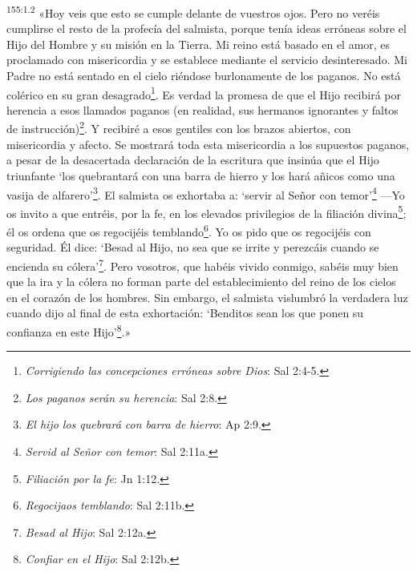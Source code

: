 \par 
\textsuperscript{155:1.2} «Hoy veis que esto se cumple delante de vuestros ojos. Pero no veréis cumplirse el resto de la profecía del salmista, porque tenía ideas erróneas sobre el Hijo del Hombre y su misión en la Tierra. Mi reino está basado en el amor, es proclamado con misericordia y se establece mediante el servicio desinteresado. Mi Padre no está sentado en el cielo riéndose burlonamente de los paganos. No está colérico en su gran desagrado\footnote{\textit{Corrigiendo las concepciones erróneas sobre Dios}: Sal 2:4-5.}. Es verdad la promesa de que el Hijo recibirá por herencia a esos llamados paganos (en realidad, sus hermanos ignorantes y faltos de instrucción)\footnote{\textit{Los paganos serán su herencia}: Sal 2:8.}. Y recibiré a esos gentiles con los brazos abiertos, con misericordia y afecto. Se mostrará toda esta misericordia a los supuestos paganos, a pesar de la desacertada declaración de la escritura que insinúa que el Hijo triunfante `los quebrantará con una barra de hierro y los hará añicos como una vasija de alfarero'\footnote{\textit{El hijo los quebrará con barra de hierro}: Ap 2:9.}. El salmista os exhortaba a: `servir al Señor con temor'\footnote{\textit{Servid al Señor con temor}: Sal 2:11a.} ---Yo os invito a que entréis, por la fe, en los elevados privilegios de la filiación divina\footnote{\textit{Filiación por la fe}: Jn 1:12.}; él os ordena que os regocijéis temblando\footnote{\textit{Regocijaos temblando}: Sal 2:11b.}. Yo os pido que os regocijéis con seguridad. Él dice: `Besad al Hijo, no sea que se irrite y perezcáis cuando se encienda su cólera'\footnote{\textit{Besad al Hijo}: Sal 2:12a.}. Pero vosotros, que habéis vivido conmigo, sabéis muy bien que la ira y la cólera no forman parte del establecimiento del reino de los cielos en el corazón de los hombres. Sin embargo, el salmista vislumbró la verdadera luz cuando dijo al final de esta exhortación: `Benditos sean los que ponen su confianza en este Hijo'\footnote{\textit{Confiar en el Hijo}: Sal 2:12b.}.»

